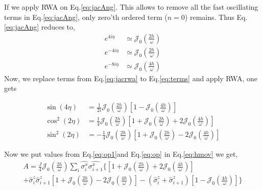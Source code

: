 \documentclass[aps,prb,reprint,showpacs,floatfix,superscriptaddress, onecolumn, nofootinbib, 9pt]{revtex4-2}
\begin{document}
\begin{enumerate}
{			If we apply RWA on Eq.\eqref{eq:jacAng}. This allows to remove all the fast oscillating terms in Eq.\eqref{eq:jacAng}, only zero'th ordered term ($n=0$) remains. Thus Eq.\eqref{eq:jacAng} reduces to, 
			\begin{align}
			e^{4i\eta} &\simeq \mathcal{J}_0\left(\frac{2h}{\omega}\right)\nonumber\\
			e^{-4i\eta} &\simeq \mathcal{J}_0\left(\frac{2h}{\omega}\right)\nonumber\\
			e^{-8i\eta} &\simeq \mathcal{J}_0\left(\frac{4h}{\omega}\right) 
			\label{eq:jacrwa}
			\end{align}
			Now, we replace terms from Eq.\eqref{eq:jacrwa} to Eq.\eqref{eq:terms} and apply RWA, one gets
			
			\begin{align}
			\sin(4\eta) &= \frac{1}{2i} \mathcal{J}_0\left(\frac{2h}{\omega}\right)\left[1-\mathcal{J}_0\left(\frac{4h}{\omega}\right)\right]\nonumber\\
			\cos^2(2\eta) &=\frac{1}{4} \mathcal{J}_0\left(\frac{2h}{\omega}\right)\left[1+\mathcal{J}_0\left(\frac{2h}{\omega}\right) +2 \mathcal{J}_0\left(\frac{4h}{\omega}\right)\right]\nonumber\\
			\sin^2(2\eta) &=-\frac{1}{4} \mathcal{J}_0\left(\frac{2h}{\omega}\right)\left[1+\mathcal{J}_0\left(\frac{2h}{\omega}\right) -2 \mathcal{J}_0\left(\frac{4h}{\omega}\right)\right]
			\label{eq:op1}
			\end{align}
		
			Now we put values from Eq.\eqref{eq:op1}and Eq.\eqref{eq:op} in Eq.\eqref{eq:hmov} we get,
			\begin{multline}
			A = \frac{J}{4}\mathcal{J}_0\left(\frac{2h}{\omega}\right)\sum_i \hat{\sigma^x_i} \hat{\sigma^x_{i+1}} \Bigg\{\left[1+\mathcal{J}_0\left(\frac{2h}{\omega}\right) + 2\mathcal{J}_0\left(\frac{4h}{\omega}\right)\right]\\ +\hat{\sigma}^z_i\hat{\sigma}^z_{i+1}\left[1+\mathcal{J}_0\left(\frac{2h}{\omega}\right)-2\mathcal{J}_0\left(\frac{4h}{\omega}\right)\right] -\left(\hat{\sigma}^z_i+\hat{\sigma}^z_{i+1}\right)\left[1-\mathcal{J}_0\left(\frac{4h}{\omega}\right)\right]\Bigg\}
			\label{eq:A}
			\end{multline}
				
}
\end{enumerate}
\end{document}
